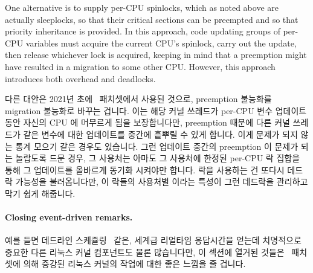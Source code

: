 One alternative is to supply per-CPU spinlocks, which as noted above
are actually sleeplocks, so that their critical sections can be
preempted and so that priority inheritance is provided.
In this approach, code updating groups of per-CPU variables must
acquire the current CPU's spinlock, carry out the update, then
release whichever lock is acquired, keeping in mind that a preemption
might have resulted in a migration to some other CPU\@.
However, this approach introduces both overhead and deadlocks.

\fi

다른 대안은 2021년 초에 \rt\ 패치셋에서 사용된 것으로, preemption 불능화를
migration 불능화로 바꾸는 겁니다.
이는 해당 커널 쓰레드가 per-CPU 변수 업데이트 동안 자신의 CPU 에 머무르게 됨을
보장합니다만, preemption 때문에 다른 커널 쓰레드가 같은 변수에 대한 업데이트를
중간에 흩뿌릴 수 있게 합니다.
이게 문제가 되지 않는 통계 모으기 같은 경우도 있습니다.
그런 업데이트 중간의 preemption 이 문제가 되는 놀랍도록 드문 경우, 그 사용처는
아마도 그 사용처에 한정된 per-CPU 락 집합을 통해 그 업데이트를 올바르게 동기화
시켜야만 합니다.
락을 사용하는 건 또다시 데드락 가능성을 불러옵니다만, 이 락들의 사용처별 이라는
특성이 그런 데드락을 관리하고 막기 쉽게 해줍니다.

\paragraph{Closing event-driven remarks.}
예를 들면 데드라인
스케쥴링~\cite{DanielBristot2018deadlinesched-1,DanielBristot2018deadlinesched-2}
같은, 세계급 리얼타임 응답시간을 얻는데 치명적으로 중요한 다른 리눅스 커널
컴포넌트도 물론 많습니다만, 이 섹션에 열거된 것들은 \rt\ 패치셋에 의해 증강된
리눅스 커널의 작업에 대한 좋은 느낌을 줄 겁니다.

